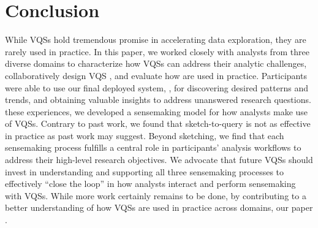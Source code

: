 \section{Conclusion\label{sec:conclusion}}
While VQSs hold tremendous promise in accelerating data exploration, they are rarely used in practice. In this paper, we worked closely with analysts from three diverse domains to characterize how VQSs can address their analytic challenges, collaboratively design VQS , and evaluate how  are used in practice. Participants were able to use our final deployed system, \zvpp, for discovering desired patterns and trends, and obtaining valuable insights to address unanswered research questions.  these experiences, we developed a sensemaking model for how analysts make use of VQSs. Contrary to past work, we found that sketch-to-query is not as effective in practice as past work may suggest. Beyond sketching, we find that each sensemaking process fulfills a central role in participants' analysis workflows to address their high-level research objectives. We advocate that future VQSs should invest in understanding and supporting all three sensemaking processes to effectively ``close the loop'' in how analysts interact and perform sensemaking with VQSs. While more work certainly remains to be done, by contributing to a better understanding of how VQSs are used in practice across domains, our paper .

